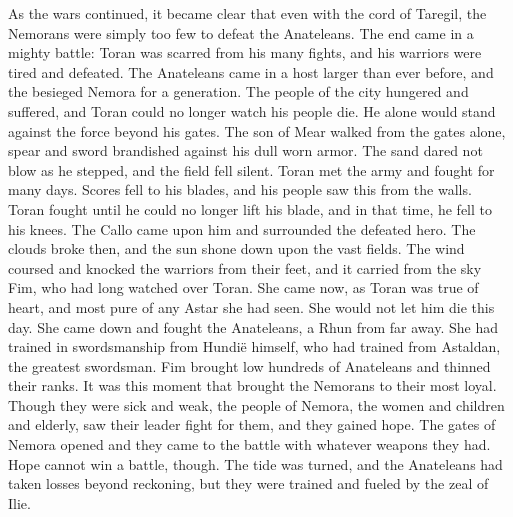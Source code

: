 \documentclass[smalldemyvopaper,11pt,twoside,onecolumn,openright,extrafontsizes]{memoir}
\begin{document}
	As the wars continued, it became clear that even with the cord of Taregil, the Nemorans were simply too few to defeat the Anateleans. The end came in a mighty battle: Toran was scarred from his many fights, and his warriors were tired and defeated. The Anateleans came in a host larger than ever before, and the besieged Nemora for a generation. The people of the city hungered and suffered, and Toran could no longer watch his people die. He alone would stand against the force beyond his gates. The son of Mear walked from the gates alone, spear and sword brandished against his dull worn armor. The sand dared not blow as he stepped, and the field fell silent. Toran met the army and fought for many days. Scores fell to his blades, and his people saw this from the walls. Toran fought until he could no longer lift his blade, and in that time, he fell to his knees. The Callo came upon him and surrounded the defeated hero. The clouds broke then, and the sun shone down upon the vast fields. The wind coursed and knocked the warriors from their feet, and it carried from the sky Fim, who had long watched over Toran. She came now, as Toran was true of heart, and most pure of any Astar she had seen. She would not let him die this day. She came down and fought the Anateleans, a Rhun from far away. She had trained in swordsmanship from Hundië himself, who had trained from Astaldan, the greatest swordsman. Fim brought low hundreds of Anateleans and thinned their ranks. It was this moment that brought the Nemorans to their most loyal. Though they were sick and weak, the people of Nemora, the women and children and elderly, saw their leader fight for them, and they gained hope. The gates of Nemora opened and they came to the battle with whatever weapons they had. Hope cannot win a battle, though. The tide was turned, and the Anateleans had taken losses beyond reckoning, but they were trained and fueled by the zeal of Ilie.
\end{document}
